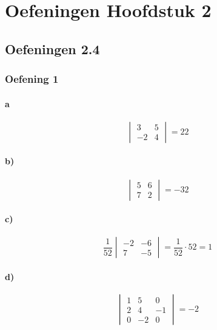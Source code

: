 \documentclass[lineaire_algebra_oplossingen.tex]{subfiles}
\begin{document}
\chapter{Oefeningen Hoofdstuk 2}
\section{Oefeningen 2.4}
\subsection{Oefening 1}
\subsubsection*{a}
\[
\begin{vmatrix}
3 & 5\\
-2 & 4
\end{vmatrix}
= 22
\]
\subsubsection*{b)}
\[
\begin{vmatrix}
5 & 6\\
7 & 2
\end{vmatrix}
= -32
\]
\subsubsection*{c)}
\[
    \frac{1}{52} \begin{vmatrix}
        -2 & -6\\
        7 & -5
    \end{vmatrix} 
    = \frac{1}{52} \cdot 52 = 1
\]
\subsubsection*{d)}
\[
\begin{vmatrix}
1 & 5 & 0\\
2 & 4 & -1\\
0 & -2 & 0
\end{vmatrix}
= -2
\]
\end{document}
